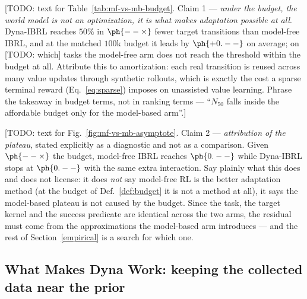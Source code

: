 [TODO: text for Table~\ref{tab:mf-vs-mb-budget}. Claim 1 --- \emph{under the
budget, the world model is not an optimization, it is what makes adaptation
possible at all}. Dyna-IBRL reaches $50\%$ in $\ph{--\times}$ fewer target
transitions than model-free IBRL, and at the matched $100$k budget it leads by
$\ph{+0.--}$ on average; on [TODO: which] tasks the model-free arm does not
reach the threshold within the budget at all. Attribute this to amortization:
each real transition is reused across many value updates through synthetic
rollouts, which is exactly the cost a sparse terminal reward
(Eq.~\ref{eq:sparse}) imposes on unassisted value learning. Phrase the takeaway
in budget terms, not in ranking terms --- ``$N_{50}$ falls inside the affordable
budget only for the model-based arm''.]

[TODO: text for Fig.~\ref{fig:mf-vs-mb-asymptote}. Claim 2 --- \emph{attribution
of the plateau}, stated explicitly as a diagnostic and not as a comparison.
Given $\ph{--\times}$ the budget, model-free IBRL reaches $\ph{0.--}$ while
Dyna-IBRL stops at $\ph{0.--}$ with the same extra interaction. Say plainly what
this does and does not license: it does \emph{not} say model-free RL is the
better adaptation method (at the budget of Def.~\ref{def:budget} it is not a
method at all), it says the model-based plateau is not caused by the budget.
Since the task, the target kernel and the success predicate are identical across
the two arms, the residual must come from the approximations the model-based arm
introduces --- and the rest of Section~\ref{empirical} is a search for which one.


\subsection{What Makes Dyna Work: keeping the collected data near the prior}
\label{sec:dyna}

